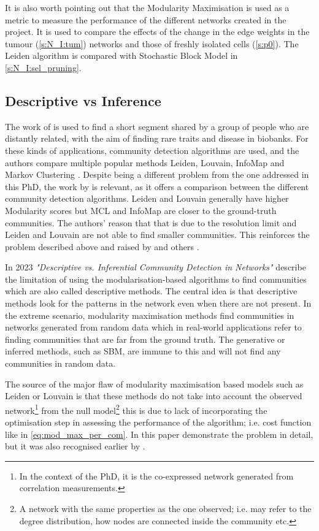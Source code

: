 It is also worth pointing out that the Modularity Maximisation is used as a metric to measure the performance of the different networks created in the project. It is used to compare the effects of the change in the edge weights in the tumour (\cref{s:N_I:tum}) networks and those of freshly isolated cells (\cref{s:p0}). The Leiden algorithm is compared with Stochastic Block Model in \cref{s:N_I:sel_pruning}.


\subsection{Descriptive vs Inference} \label{s:lit:descriptive_inference}

The work of \citet{Shemirani2023-ww} is used to find a short segment shared by a group of people who are distantly related, with the aim of finding rare traits and disease in biobanks. For these kinds of applications, community detection algorithms are used, and the authors compare multiple popular methods Leiden, Louvain, InfoMap \citep{Rosvall2008-kw} and Markov Clustering \citep{Van_Dongen2008-yj}. Despite being a different problem from the one addressed in this PhD, the work by \citet{Shemirani2023-ww} is relevant, as it offers a comparison between the different community detection algorithms. Leiden and Louvain generally have higher Modularity scores but MCL and InfoMap are closer to the ground-truth communities. The authors' reason that that is due to the resolution limit and Leiden and Louvain are not able to find smaller communities. This reinforces the problem described above and raised by \citep{Peixoto2023-se} and others \citep{Fortunato2007-gh, Traag2019-ne}.

In 2023 \textit{"Descriptive vs. Inferential Community Detection in Networks"} \citep{Peixoto2023-se} describe the limitation of using the modularisation-based algorithms to find communities which are also called descriptive methods. The central idea is that descriptive methods look for the patterns in the network even when there are not present. In the extreme scenario, modularity maximisation methods find communities in networks generated from random data which in real-world applications refer to finding communities that are far from the ground truth. The generative or inferred methods, such as SBM, are immune to this and will not find any communities in random data.

The source of the major flaw of modularity maximisation based models such as Leiden or Louvain is that these methods do not take into account the observed network\footnote{In the context of the PhD, it is the co-expressed network generated from correlation measurements.} from the null model\footnote{A network with the same properties as the one observed; i.e. may refer to the degree distribution, how nodes are connected inside the community etc.} this is due to lack of incorporating the optimisation step in assessing the performance of the algorithm; i.e. cost function like in \cref{eq:mod_max_per_com}. In this paper \citet{Peixoto2023-se} demonstrate the problem in detail, but it was also recognised earlier by \citet{Guimera2004-gv}.

